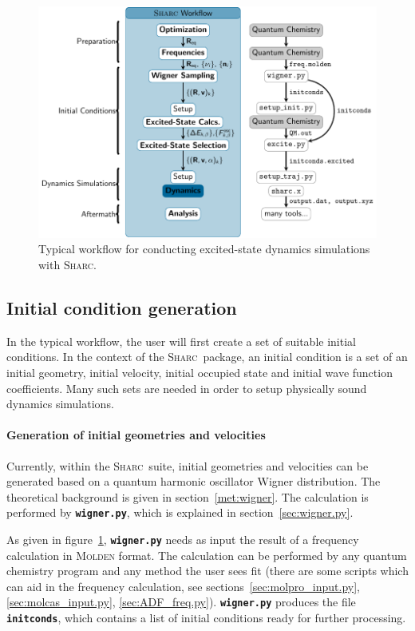 \documentclass[a4paper,10pt,DIV=15,openany]{scrbook}
\newcommand{\sharc}{\textsc{Sharc}}
\newcommand{\ttt}[1]{\textbf{\texttt{#1}}}
\begin{document}
\begin{figure}[htb]
  \centering
  \includegraphics[scale=1]{img/workflow/prepare.pdf}
  \caption{Typical workflow for conducting excited-state dynamics simulations with \sharc.}
  \label{fig:workflow}
\end{figure}

\subsection{Initial condition generation}

In the typical workflow, the user will first create a set of suitable initial conditions. In the context of the \sharc\ package, an initial condition is a set of an initial geometry, initial velocity, initial occupied state and initial wave function coefficients. 
Many such sets are needed in order to setup physically sound dynamics simulations.

\paragraph{Generation of initial geometries and velocities}

Currently, within the \sharc\ suite, initial geometries and velocities can be generated based on a quantum harmonic oscillator Wigner distribution. The theoretical background is given in section~\ref{met:wigner}. The calculation is performed by \ttt{wigner.py}, which is explained in section~\ref{sec:wigner.py}. 

As given in figure~\ref{fig:workflow}, \ttt{wigner.py} needs as input the result of a frequency calculation in \textsc{Molden} format. The calculation can be performed by any quantum chemistry program and any method the user sees fit (there are some scripts which can aid in the frequency calculation, see sections~\ref{sec:molpro_input.py}, \ref{sec:molcas_input.py}, \ref{sec:ADF_freq.py}). 
\ttt{wigner.py} produces the file \ttt{initconds}, which contains a list of initial conditions ready for further processing.
\end{document}
